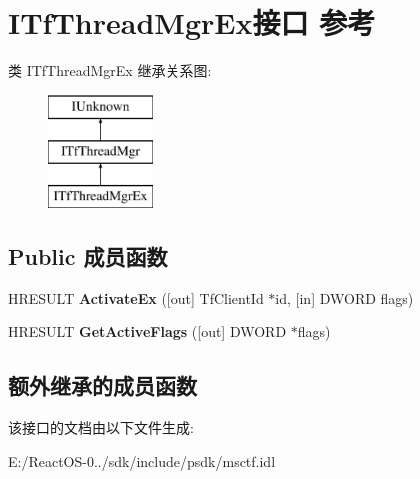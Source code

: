 \hypertarget{interface_i_tf_thread_mgr_ex}{}\section{I\+Tf\+Thread\+Mgr\+Ex接口 参考}
\label{interface_i_tf_thread_mgr_ex}
类 I\+Tf\+Thread\+Mgr\+Ex 继承关系图\+:\begin{figure}[H]
\begin{center}
\leavevmode
\includegraphics[height=3.000000cm]{interface_i_tf_thread_mgr_ex}
\end{center}
\end{figure}
\subsection*{Public 成员函数}
\begin{DoxyCompactItemize}
\item 
\mbox{\label{interface_i_tf_thread_mgr_ex_a764886d43c8bfeffc9c7374d45411d03}} 
H\+R\+E\+S\+U\+LT {\bfseries Activate\+Ex} (\mbox{[}out\mbox{]} Tf\+Client\+Id $\ast$id, \mbox{[}in\mbox{]} D\+W\+O\+RD flags)
\item 
\mbox{\label{interface_i_tf_thread_mgr_ex_adbd23d377dac002d70b735221a819666}} 
H\+R\+E\+S\+U\+LT {\bfseries Get\+Active\+Flags} (\mbox{[}out\mbox{]} D\+W\+O\+RD $\ast$flags)
\end{DoxyCompactItemize}
\subsection*{额外继承的成员函数}


该接口的文档由以下文件生成\+:\begin{DoxyCompactItemize}
\item 
E\+:/\+React\+O\+S-\/0../sdk/include/psdk/msctf.\+idl\end{DoxyCompactItemize}
